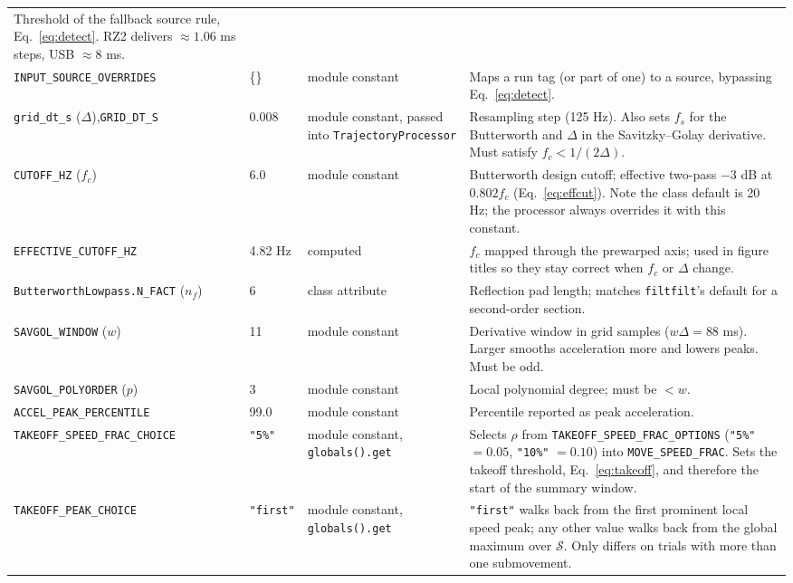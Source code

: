 \documentclass[11pt,a4paper]{article}
\newcommand{\code}[1]{\texttt{\small #1}}
\begin{document}
\begin{longtable}{@{}P{4.0cm}P{1.65cm}P{3.55cm}P{5.75cm}@{}}
  Threshold of the fallback source rule, Eq.~\eqref{eq:detect}. RZ2 delivers
  $\approx 1.06$ ms steps, USB $\approx 8$ ms. \\
\code{INPUT\_SOURCE\_\-OVERRIDES} & \{\} & module constant &
  Maps a run tag (or part of one) to a source, bypassing Eq.~\eqref{eq:detect}. \\
\code{grid\_dt\_s} ($\Delta$),\newline\code{GRID\_DT\_S} & 0.008 &
  module constant, passed into \code{TrajectoryProcessor} &
  Resampling step (125 Hz). Also sets $f_s$ for the Butterworth and $\Delta$ in
  the Savitzky--Golay derivative. Must satisfy $f_c < 1/(2\Delta)$. \\
\code{CUTOFF\_HZ} ($f_c$) & 6.0 & module constant &
  Butterworth design cutoff; effective two-pass $-3$ dB at $0.802 f_c$
  (Eq.~\eqref{eq:effcut}). Note the class default is 20 Hz; the processor always
  overrides it with this constant. \\
\code{EFFECTIVE\_CUTOFF\_HZ} & 4.82 Hz & computed &
  $f_c$ mapped through the prewarped axis; used in figure titles so they stay
  correct when $f_c$ or $\Delta$ change. \\
\code{Butterworth\-Lowpass.N\_FACT} ($n_f$) & 6 & class attribute &
  Reflection pad length; matches \code{filtfilt}'s default for a second-order
  section. \\
\code{SAVGOL\_WINDOW} ($w$) & 11 & module constant &
  Derivative window in grid samples ($w\Delta = 88$ ms). Larger smooths
  acceleration more and lowers peaks. Must be odd. \\
\code{SAVGOL\_POLYORDER} ($p$) & 3 & module constant &
  Local polynomial degree; must be $< w$. \\
\code{ACCEL\_PEAK\_\-PERCENTILE} & 99.0 & module constant &
  Percentile reported as peak acceleration. \\
\code{TAKEOFF\_SPEED\_\-FRAC\_CHOICE} & \code{"5\%"} & module constant,
  \code{globals().get} &
  Selects $\rho$ from \code{TAKEOFF\_SPEED\_FRAC\_OPTIONS} (\code{"5\%"} $=0.05$,
  \code{"10\%"} $=0.10$) into \code{MOVE\_SPEED\_FRAC}. Sets the takeoff
  threshold, Eq.~\eqref{eq:takeoff}, and therefore the start of the summary
  window. \\
\code{TAKEOFF\_PEAK\_CHOICE} & \code{"first"} & module constant,
  \code{globals().get} &
  \code{"first"} walks back from the first prominent local speed peak; any
  other value walks back from the global maximum over $\mathcal{S}$. Only
  differs on trials with more than one submovement. \\

\end{longtable}
\end{document}

